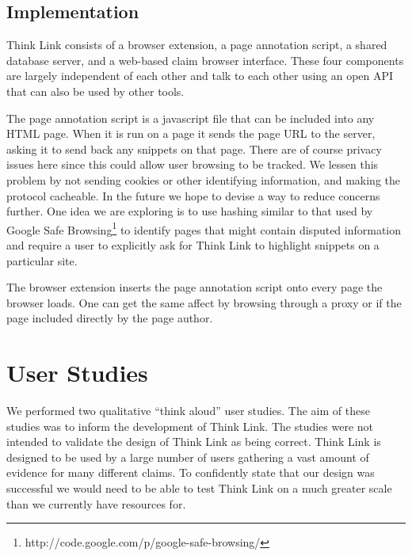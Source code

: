 \documentclass{chi2009}
\newcommand{\todo}[1]{}
\begin{document}
\todo{Mention about topic previewing}

\todo{Allow two claims to be marked as being identical.}

\todo{BUG: don't have 'add' button for snippets}


\subsection{Implementation}

Think Link consists of a browser extension, a page annotation script, a shared database server, and a web-based claim browser interface. These four components are largely independent of each other and talk to each other using an open API that can also be used by other tools. 

The page annotation script is a javascript file that can be included into any HTML page. When it is run on a page it sends the page URL to the server, asking it to send back any snippets on that page. There are of course privacy issues here since this could allow user browsing to be tracked. We lessen this problem by not sending cookies or other identifying information, and making the protocol cacheable. 
In the future we hope to devise a way to reduce concerns further. 
One idea we are exploring is to use hashing similar to that used by Google Safe Browsing\footnote{http://code.google.com/p/google-safe-browsing/} to identify pages that might contain disputed information and require a user to explicitly ask for Think Link to highlight snippets on a particular site.

The browser extension inserts the page annotation script onto every page the browser loads. One can get the same affect by browsing through a proxy or if the page included directly by the page author.




\section{User Studies}

We performed two qualitative ``think aloud'' user studies. The aim of these studies was to inform the development of Think Link. The studies were not intended to validate the design of Think Link as being correct. Think Link is designed to be used by a large number of users gathering a vast amount of evidence for many different claims. To confidently state that our design was successful we would need to be able to test Think Link on a much greater scale than we currently have resources for.
\end{document}
